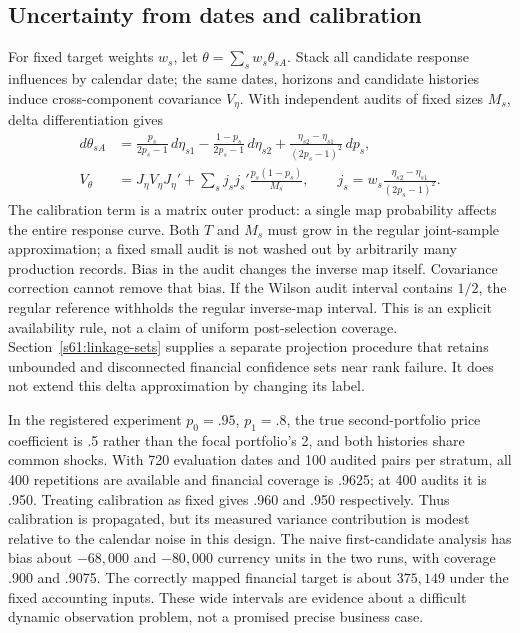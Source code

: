 \subsection{Uncertainty from dates and calibration}
For fixed target weights $w_s$, let
$\theta=\sum_sw_s\theta_{sA}$. Stack all candidate response influences by
calendar date; the same dates, horizons and candidate histories induce
cross-component covariance $V_\eta$. With independent audits of fixed sizes
$M_s$, delta differentiation gives
\begin{align}
 d\theta_{sA}
 &=\frac{p_s}{2p_s-1}\,d\eta_{s1}
   -\frac{1-p_s}{2p_s-1}\,d\eta_{s2}
   +\frac{\eta_{s2}-\eta_{s1}}{(2p_s-1)^2}\,dp_s,\nonumber\\
 V_\theta
 &=J_\eta V_\eta J_\eta'
   +\sum_s j_sj_s'\frac{p_s(1-p_s)}{M_s},\qquad
 j_s=w_s\frac{\eta_{s2}-\eta_{s1}}{(2p_s-1)^2}.
 \label{s6:linkage-variance}
\end{align}
The calibration term is a matrix outer product: a single map probability
affects the entire response curve. Both $T$ and $M_s$ must grow in the
regular joint-sample approximation; a fixed small audit is not washed out
by arbitrarily many production records. Bias in the audit changes the
inverse map itself. Covariance correction cannot remove that bias.
If the Wilson audit interval contains $1/2$, the regular reference withholds the
regular inverse-map interval. This is an explicit availability rule, not
a claim of uniform post-selection coverage.
Section~\ref{s61:linkage-sets} supplies a separate projection procedure that
retains unbounded and disconnected financial confidence sets near rank
failure. It does not extend this delta approximation by changing its label.

In the registered experiment $p_0=.95$, $p_1=.8$, the true second-portfolio
price coefficient is .5 rather than the focal portfolio's 2, and both
histories share common shocks. With 720 evaluation dates and 100 audited
pairs per stratum, all 400 repetitions are available and financial coverage
is .9625; at 400 audits it is .950. Treating calibration as fixed gives
.960 and .950 respectively. Thus calibration is propagated, but its measured
variance contribution is modest relative to the calendar noise in this
design. The naive first-candidate analysis has bias about $-68{,}000$ and
$-80{,}000$ currency units in the two runs, with coverage .900 and .9075.
The correctly mapped financial target is about $375{,}149$ under the fixed
accounting inputs. These wide intervals are evidence about a difficult
dynamic observation problem, not a promised precise business case.


